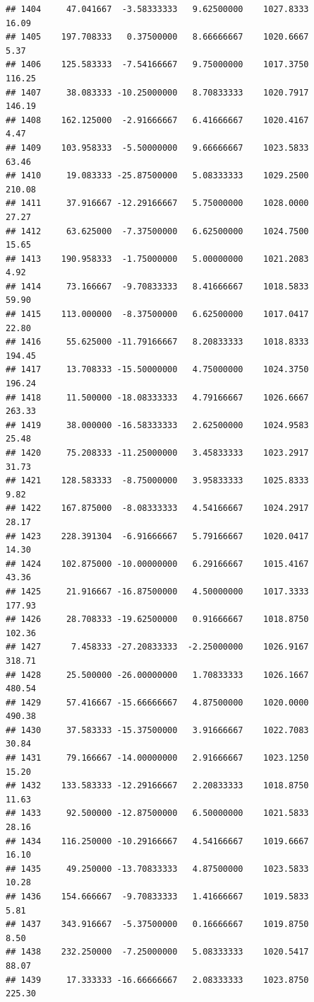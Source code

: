\documentclass[
]{article}
\begin{document}
\begin{verbatim}
## 1404     47.041667  -3.58333333   9.62500000    1027.8333       16.09
## 1405    197.708333   0.37500000   8.66666667    1020.6667        5.37
## 1406    125.583333  -7.54166667   9.75000000    1017.3750      116.25
## 1407     38.083333 -10.25000000   8.70833333    1020.7917      146.19
## 1408    162.125000  -2.91666667   6.41666667    1020.4167        4.47
## 1409    103.958333  -5.50000000   9.66666667    1023.5833       63.46
## 1410     19.083333 -25.87500000   5.08333333    1029.2500      210.08
## 1411     37.916667 -12.29166667   5.75000000    1028.0000       27.27
## 1412     63.625000  -7.37500000   6.62500000    1024.7500       15.65
## 1413    190.958333  -1.75000000   5.00000000    1021.2083        4.92
## 1414     73.166667  -9.70833333   8.41666667    1018.5833       59.90
## 1415    113.000000  -8.37500000   6.62500000    1017.0417       22.80
## 1416     55.625000 -11.79166667   8.20833333    1018.8333      194.45
## 1417     13.708333 -15.50000000   4.75000000    1024.3750      196.24
## 1418     11.500000 -18.08333333   4.79166667    1026.6667      263.33
## 1419     38.000000 -16.58333333   2.62500000    1024.9583       25.48
## 1420     75.208333 -11.25000000   3.45833333    1023.2917       31.73
## 1421    128.583333  -8.75000000   3.95833333    1025.8333        9.82
## 1422    167.875000  -8.08333333   4.54166667    1024.2917       28.17
## 1423    228.391304  -6.91666667   5.79166667    1020.0417       14.30
## 1424    102.875000 -10.00000000   6.29166667    1015.4167       43.36
## 1425     21.916667 -16.87500000   4.50000000    1017.3333      177.93
## 1426     28.708333 -19.62500000   0.91666667    1018.8750      102.36
## 1427      7.458333 -27.20833333  -2.25000000    1026.9167      318.71
## 1428     25.500000 -26.00000000   1.70833333    1026.1667      480.54
## 1429     57.416667 -15.66666667   4.87500000    1020.0000      490.38
## 1430     37.583333 -15.37500000   3.91666667    1022.7083       30.84
## 1431     79.166667 -14.00000000   2.91666667    1023.1250       15.20
## 1432    133.583333 -12.29166667   2.20833333    1018.8750       11.63
## 1433     92.500000 -12.87500000   6.50000000    1021.5833       28.16
## 1434    116.250000 -10.29166667   4.54166667    1019.6667       16.10
## 1435     49.250000 -13.70833333   4.87500000    1023.5833       10.28
## 1436    154.666667  -9.70833333   1.41666667    1019.5833        5.81
## 1437    343.916667  -5.37500000   0.16666667    1019.8750        8.50
## 1438    232.250000  -7.25000000   5.08333333    1020.5417       88.07
## 1439     17.333333 -16.66666667   2.08333333    1023.8750      225.30

\end{verbatim}
\end{document}
